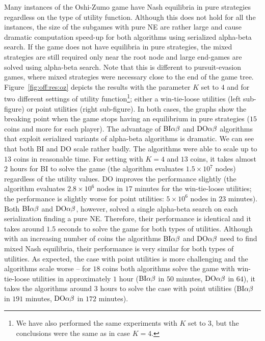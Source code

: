 Many instances of the Oshi-Zumo game have Nash equilibria in pure strategies regardless on the type of utility function.
Although this does not hold for all the instances, the size of the subgames with pure NE are rather large and cause dramatic computation speed-up for both algorithms using serialized alpha-beta search.
If the game does not have equilibria in pure strategies, the mixed strategies are still required only near the root node and large end-games are solved using alpha-beta search.
Note that this is different to pursuit-evasion games, where mixed strategies were necessary close to the end of the game tree.
Figure~\ref{fig:off:res:oz} depicts the results with the parameter $K$ set to $4$ and for two different settings of utility function\footnote{We have also performed the same experiments with $K$ set to $3$, but the conclusions were the same as in case $K=4$.}; either a win-tie-loose utilities (left sub-figure) or point utilities (right sub-figure).
In both cases, the graphs show the breaking point when the game stops having an equilibrium in pure strategies ($15$ coins and more for each player).
The advantage of $\textrm{BI}\alpha\beta$ and $\textrm{DO}\alpha\beta$ algorithms that exploit serialized variants of alpha-beta algorithms is dramatic.
We can see that both \textsc{BI} and \textsc{DO} scale rather badly.
The algorithms were able to scale up to $13$ coins in reasonable time.
For setting with $K=4$ and $13$ coins, it takes almost $2$ hours for \textsc{BI} to solve the game (the algorithm evaluates $1.5\times10^7$ nodes) regardless of the utility values.
\textsc{DO} improves the performance slightly (the algorithm evaluates $2.8\times10^6$ nodes in $17$ minutes for the win-tie-loose utilities; the performance is slightly worse for point utilities: $5\times10^6$ nodes in $23$ minutes).
Both $\textrm{BI}\alpha\beta$ and $\textrm{DO}\alpha\beta$, however, solved a single alpha-beta search on each serialization finding a pure NE.
Therefore, their performance is identical and it takes around $1.5$ seconds to solve the game for both types of utilities.
Although with an increasing number of coins the algorithms $\textrm{BI}\alpha\beta$ and $\textrm{DO}\alpha\beta$ need to find mixed Nash equilibria, their performance is very similar for both types of utilities.
As expected, the case with point utilities is more challenging and the algorithms scale worse -- for $18$ coins both algorithms solve the game with win-tie-loose utilities in approximately $1$ hour ($\textrm{BI}\alpha\beta$ in $50$ minutes, $\textrm{DO}\alpha\beta$ in $64$), it takes the algorithms around $3$ hours to solve the case with point utilities ($\textrm{BI}\alpha\beta$ in $191$ minutes, $\textrm{DO}\alpha\beta$ in $172$ minutes).

